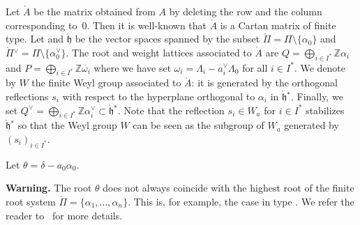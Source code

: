 \documentclass[pdftex]{sigma}
\numberwithin{equation}{section}
\newcommand{\al}{\alpha}
\newcommand{\fh}{\mathfrak{h}}
\begin{document}
Let $\mathring{A}$
be the matrix obtained from $A$ by deleting the row and the column corresponding to~$0$. Then it is well-known that $\mathring{A}$ is a Cartan matrix of finite type. Let \smash{$\mathring{\fh}{}^\ast$} and $\mathring{\fh}$ be the vector spaces spanned by the subset $\mathring{\Pi} = \Pi\setminus \{\al_0\}$ and $\mathring{\Pi}{}^\vee = \Pi\setminus \bigl\{\al^\vee_0\bigr\}$. The root and weight lattices associated to $\mathring{A}$ are $Q=\bigoplus_{i\in I^\ast}\mathbb{Z}\alpha_{i}$ and $P=\bigoplus_{i\in I^\ast}\mathbb{Z}\omega_{i}$ where we have set $\omega_{i}=\Lambda_{i}-a_{i}^{\vee}\Lambda_{0}$ for all $i\in I^\ast$. We denote by $W$ the finite Weyl group associated to $\mathring{A}$: it is generated by the orthogonal reflections $s_i$ with respect to the hyperplane orthogonal to $\al_i$ in $\mathring{\fh}{}^\ast$. Finally, we set $Q^\vee=\bigoplus_{i\in I^\ast}\mathbb{Z}\alpha^\vee_{i}\subset \mathring{\fh}{}^\ast$. Note that the reflection $s_i\in W_a$ for $i\in I^\ast$ stabilizes~$\mathring{\fh}{}^\ast$ so that the Weyl group $W$ can be seen as the subgroup of $W_a$ generated by $(s_i)_{i\in I^\ast}$.

Let
$
\theta=\delta-a_0\alpha_0$.


\textbf{Warning.} The root $\theta$ does not always coincide with the highest root of the finite root system $\mathring{\Pi} = \{\al_1,\dots,\al_n\}$. This is, for example, the case in type . We refer the reader to~\cite[Proposition~17.18]{carter_affine} for more details.
\end{document}

